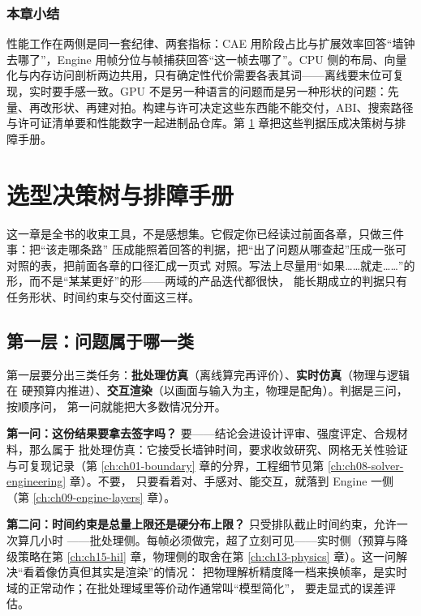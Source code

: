 \documentclass[12pt,a4paper,fontset=fandol]{ctexbook}
\newcommand{\Lang}[1]{\textsf{#1}}
\newcommand{\DomCAE}{\Lang{CAE}}
\newcommand{\DomEngine}{\Lang{Engine}}
\begin{document}
\subsection*{本章小结}
性能工作在两侧是同一套纪律、两套指标：\DomCAE{} 用阶段占比与扩展效率回答``墙钟去哪了''，\DomEngine{} 用帧分位与帧捕获回答``这一帧去哪了''。CPU 侧的布局、向量化与内存访问剖析两边共用，只有确定性代价需要各表其词——离线要末位可复现，实时要手感一致。GPU 不是另一种语言的问题而是另一种形状的问题：先量、再改形状、再建对拍。构建与许可决定这些东西能不能交付，ABI、搜索路径与许可证清单要和性能数字一起进制品仓库。第 \ref{ch:ch18-decision} 章把这些判据压成决策树与排障手册。

\chapter{选型决策树与排障手册}
\label{ch:ch18-decision}

这一章是全书的收束工具，不是感想集。它假定你已经读过前面各章，只做三件事：把``该走哪条路''
压成能照着回答的判据，把``出了问题从哪查起''压成一张可对照的表，把前面各章的口径汇成一页式
对照。写法上尽量用``如果……就走……''的形，而不是``某某更好''的形——两域的产品迭代都很快，
能长期成立的判据只有任务形状、时间约束与交付面这三样。

\section{第一层：问题属于哪一类}
\label{sec:ch18-classify}

第一层要分出三类任务：\textbf{批处理仿真}（离线算完再评价）、\textbf{实时仿真}（物理与逻辑在
硬预算内推进）、\textbf{交互渲染}（以画面与输入为主，物理是配角）。判据是三问，按顺序问，
第一问就能把大多数情况分开。

\textbf{第一问：这份结果要拿去签字吗？} 要——结论会进设计评审、强度评定、合规材料，那么属于
批处理仿真：它接受长墙钟时间，要求收敛研究、网格无关性验证与可复现记录（第
\ref{ch:ch01-boundary} 章的分界，工程细节见第 \ref{ch:ch08-solver-engineering} 章）。不要，
只要看着对、手感对、能交互，就落到 \DomEngine{} 一侧（第 \ref{ch:ch09-engine-layers} 章）。

\textbf{第二问：时间约束是总量上限还是硬分布上限？} 只受排队截止时间约束，允许一次算几小时
——批处理侧。每帧必须做完，超了立刻可见——实时侧（预算与降级策略在第 \ref{ch:ch15-hil}
章，物理侧的取舍在第 \ref{ch:ch13-physics} 章）。这一问解决``看着像仿真但其实是渲染''的情况：
把物理解析精度降一档来换帧率，是实时域的正常动作；在批处理域里等价动作通常叫``模型简化''，
要走显式的误差评估。
\end{document}
